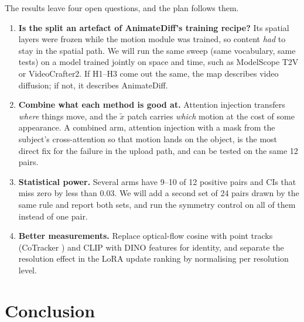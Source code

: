 \documentclass[twoside,english]{article}
\newcommand{\xd}{\tilde{x}}       %
\begin{document}
The results leave four open questions, and the plan follows them.
\begin{enumerate}
\item \textbf{Is the split an artefact of AnimateDiff's training recipe?} Its spatial layers were frozen
  while the motion module was trained, so content \emph{had} to stay in the spatial path. We will run the
  same sweep (same vocabulary, same tests) on a model trained jointly on space and time, such as
  ModelScope T2V or VideoCrafter2. If H1--H3 come out the same, the map describes video diffusion; if not,
  it describes AnimateDiff.
\item \textbf{Combine what each method is good at.} Attention injection transfers \emph{where} things move,
  and the $\xd$ patch carries \emph{which} motion at the cost of some appearance. A combined arm, attention
  injection with a mask from the subject's cross-attention so that motion lands on the object, is the
  most direct fix for the failure in the upload path, and can be tested on the same 12 pairs.
\item \textbf{Statistical power.} Several arms have 9--10 of 12 positive pairs and CIs that miss zero by
  less than 0.03. We will add a second set of 24 pairs drawn by the same rule and report both sets, and
  run the symmetry control on all of them instead of one pair.
\item \textbf{Better measurements.} Replace optical-flow cosine with point tracks (CoTracker
  \citep{karaev2024cotracker}) and CLIP with DINO features for identity, and separate the resolution effect
  in the LoRA update ranking by normalising per resolution level.
\end{enumerate}

\section{Conclusion} \label{sec:conclusion}
\end{document}
